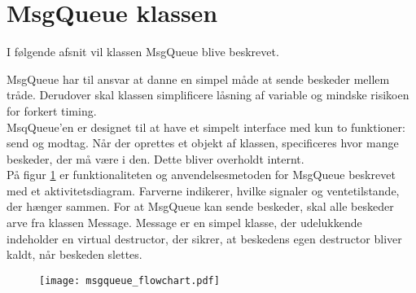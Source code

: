 %

%

\section{MsgQueue klassen}

I følgende afsnit vil klassen MsgQueue blive beskrevet.

MsgQueue har til ansvar at danne en simpel måde at sende beskeder mellem tråde. 
Derudover skal klassen simplificere låsning af variable og mindske risikoen for forkert timing. \\
MsqQueue'en er designet til at have et simpelt interface med kun to funktioner: send og modtag.
Når der oprettes et objekt af klassen, specificeres hvor mange beskeder, der må være i den. Dette bliver overholdt internt. \\
På figur \ref{fig:msgqueue_flowchart} er funktionaliteten og anvendelsesmetoden for MsgQueue beskrevet med et aktivitetsdiagram.
Farverne indikerer, hvilke signaler og ventetilstande, der hænger sammen. 
For at MsgQueue kan sende beskeder, skal alle beskeder arve fra klassen Message. Message er en simpel klasse, der udelukkende indeholder en virtual destructor, der sikrer, at beskedens egen destructor bliver kaldt, når beskeden slettes.

\begin{figure} [H]
\centering
	\texttt{[image: msgqueue\_flowchart.pdf]}
	\label{fig:msgqueue_flowchart}
\end{figure}

%